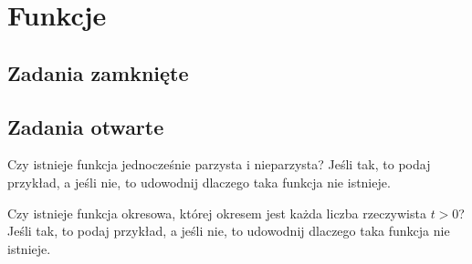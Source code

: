\setcounter{parc}{0}
\addtocounter{chapc}{1}

\chapter{Funkcje}

\section{Zadania zamknięte}

\section{Zadania otwarte}

\zadanie Czy istnieje funkcja jednocześnie parzysta i nieparzysta? Jeśli tak, to podaj przykład, a jeśli nie, to udowodnij dlaczego taka funkcja nie istnieje.

\zadanie Czy istnieje funkcja okresowa, której okresem jest każda liczba rzeczywista $t > 0$? Jeśli tak, to podaj przykład, a jeśli nie, to udowodnij dlaczego taka funkcja nie istnieje.